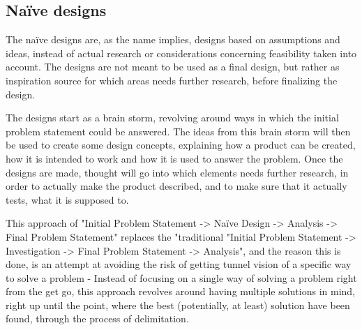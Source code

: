 \subsection{Naïve designs}
The naïve designs are, as the name implies, designs based on assumptions and ideas, instead of actual research or considerations concerning feasibility taken into account. The designs are not meant to be used as a final design, but rather as inspiration source for which areas needs further research, before finalizing the design.

The designs start as a brain storm, revolving around ways in which the initial problem statement could be answered. The ideas from this brain storm will then be used to create some design concepts, explaining how a product can be created, how it is intended to work and how it is used to answer the problem. Once the designs are made, thought will go into which elements needs further research, in order to actually make the product described, and to make sure that it actually tests, what it is supposed to.

This approach of "Initial Problem Statement -> Naïve Design -> Analysis -> Final Problem Statement" replaces the "traditional "Initial Problem Statement -> Investigation -> Final Problem Statement -> Analysis", and the reason this is done, is an attempt at avoiding the risk of getting tunnel vision of a specific way to solve a problem - Instead of focusing on a single way of solving a problem right from the get go, this approach revolves around having multiple solutions in mind, right up until the point, where the best (potentially, at least) solution have been found, through the process of delimitation.
